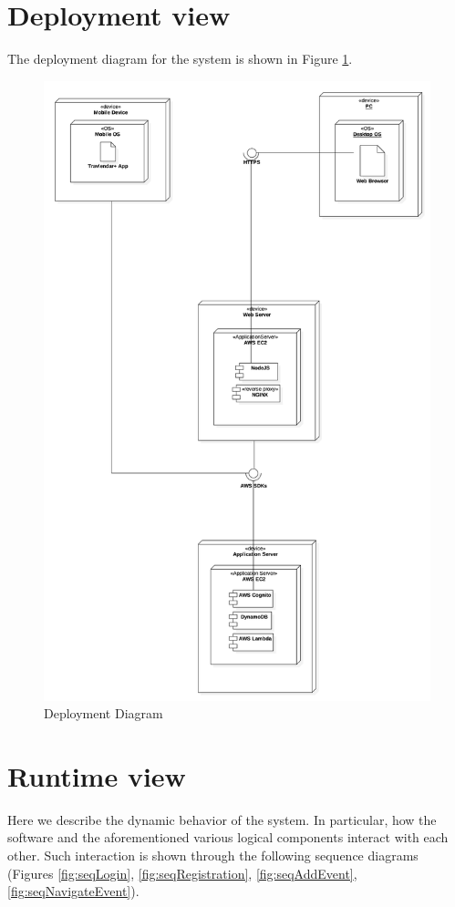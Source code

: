 \section{Deployment view}
\label{sec:depl_view}
The deployment diagram for the system is shown in Figure \ref{fig:depl_diagram}.

\begin{figure}
	\centering
	\includegraphics[width=6in]{./diagrams/DeploymentDiagram.png}
	\caption{Deployment Diagram}
	\label{fig:depl_diagram}
\end{figure}

\section{Runtime view}
\label{sec:runtime_view}
Here we describe the dynamic behavior of the system. In particular, how the software and the aforementioned various logical components interact with each other. Such interaction is shown through the following sequence diagrams (Figures \ref{fig:seqLogin}, \ref{fig:seqRegistration}, \ref{fig:seqAddEvent}, \ref{fig:seqNavigateEvent}).

